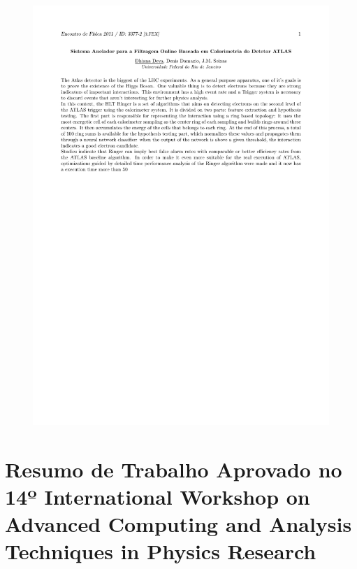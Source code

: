 \documentclass[a4paper,10pt,titlepage]{article}
\begin{document}
\begin{figure}[htbp!]
 \includegraphics[scale=0.8,keepaspectratio=true,clip=true,trim=55px 300px 50px 50px]{Figs/abstracts/enfpc_xxxii/R3377-2.pdf}
\end{figure}

\clearpage

\section{Resumo de Trabalho Aprovado no 14º International Workshop on Advanced Computing and Analysis Techniques in Physics Research}
\end{document}
